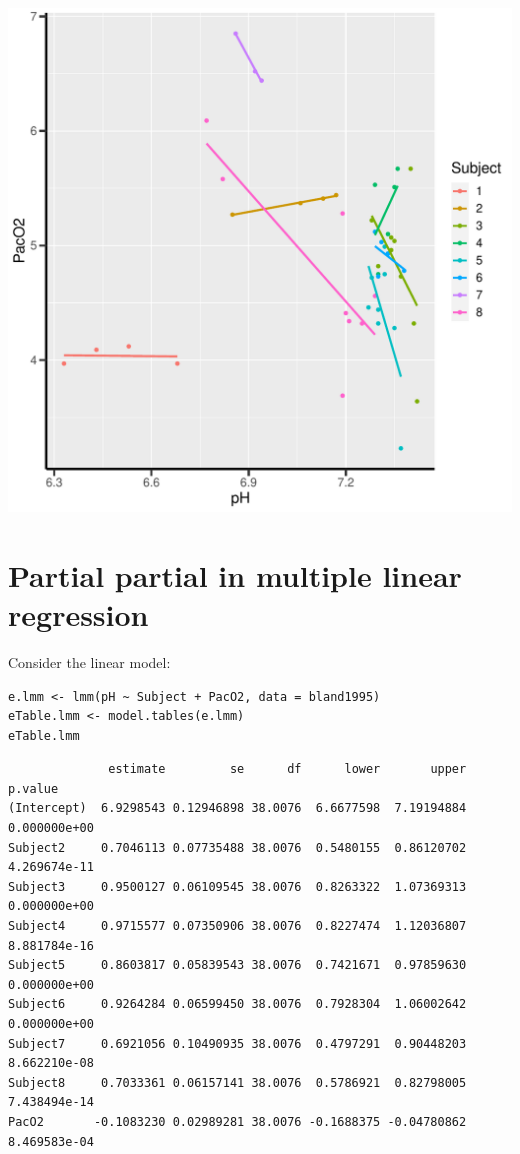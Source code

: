 \documentclass[12pt]{article}
\begin{document}
\begin{center}
\includegraphics[trim={0 0 0 0},width=1\textwidth]{./figures/gg-describe-dataset.pdf}
\end{center}


\clearpage

\section{Partial partial in multiple linear regression}
\label{sec:org6b84dc5}

Consider the linear model:
\lstset{language=r,label= ,caption= ,captionpos=b,numbers=none}
\begin{lstlisting}
e.lmm <- lmm(pH ~ Subject + PacO2, data = bland1995)
eTable.lmm <- model.tables(e.lmm)
eTable.lmm
\end{lstlisting}

\begin{verbatim}
              estimate         se      df      lower       upper      p.value
(Intercept)  6.9298543 0.12946898 38.0076  6.6677598  7.19194884 0.000000e+00
Subject2     0.7046113 0.07735488 38.0076  0.5480155  0.86120702 4.269674e-11
Subject3     0.9500127 0.06109545 38.0076  0.8263322  1.07369313 0.000000e+00
Subject4     0.9715577 0.07350906 38.0076  0.8227474  1.12036807 8.881784e-16
Subject5     0.8603817 0.05839543 38.0076  0.7421671  0.97859630 0.000000e+00
Subject6     0.9264284 0.06599450 38.0076  0.7928304  1.06002642 0.000000e+00
Subject7     0.6921056 0.10490935 38.0076  0.4797291  0.90448203 8.662210e-08
Subject8     0.7033361 0.06157141 38.0076  0.5786921  0.82798005 7.438494e-14
PacO2       -0.1083230 0.02989281 38.0076 -0.1688375 -0.04780862 8.469583e-04
\end{verbatim}
\end{document}
